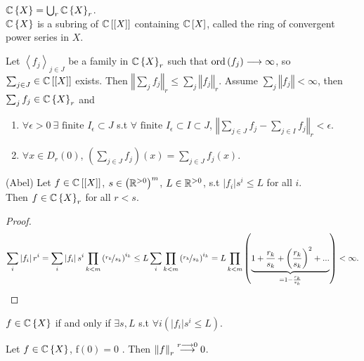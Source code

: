 \begin{defn*}
\label{10.4} $\mathbb{C}\left\{ X\right\} =\bigcup_{r}\mathbb{C}\left\{ X\right\} _{r}$.\\
$\mathbb{C}\left\{ X\right\} $ is a subring of $\mathbb{C}\left[\left[X\right]\right]$
containing $\mathbb{C}\left[X\right]$, called the ring of convergent power
series in $X$.\end{defn*}
\begin{xca*}
\label{10.5} Let $\left\langle f_{j}\right\rangle _{j\in J}$ be a family
in $\mathbb{C}\left\{ X\right\} _{r}$ such that $\mathrm{ord}\left(f_{j}\right)\longrightarrow\infty$,
so $\sum_{j\in J}\in\mathbb{C}\left[\left[X\right]\right]$ exists. Then $\left\Vert \sum_{j}f_{j}\right\Vert _{r}\leq\sum_{j}\left\Vert f_{j}\right\Vert _{r}$.
Assume $\sum_{j}\left\Vert f_{j}\right\Vert <\infty$, then $\sum_{j}f_{j}\in\mathbb{C}\left\{ X\right\} _{r}$
and\end{xca*}
\begin{enumerate}
\item $\forall\epsilon>0\ \exists\textrm{ finite }I_{\epsilon}\subset J$ s.t
$\forall\textrm{ finite }I_{\epsilon}\subset I\subset J$, $\left\Vert \sum_{j\in J}f_{j}-\sum_{j\in I}f_{j}\right\Vert _{r}<\epsilon$.
\item $\forall x\in D_{r}\left(0\right)$, $\left(\sum_{j\in J}f_{j}\right)\left(x\right)=\sum_{j\in J}f_{j}\left(x\right)$.\end{enumerate}
\begin{lem*}
\label{10.6} (Abel) Let $f\in\mathbb{C}\left[\left[X\right]\right]$, $s\in\left(\mathbb{R}^{>0}\right)^{m}$,
$L\in\mathbb{R}^{>0}$, s.t $\left|f_{i}\right|s^{i}\leq L$ for all $i$.\\
Then $f\in\mathbb{C}\left\{ X\right\} _{r}$ for all $r<s$.\end{lem*}
\begin{proof}
\[
\sum_{i}\left|f_{i}\right|r^{i}=\sum_{i}\left|f_{i}\right|s^{i}\prod_{k<m}\left(\nicefrac{r_{k}}{s_{k}}\right)^{i_{k}}\leq L\sum_{i}\prod_{k<m}\left(\nicefrac{r_{k}}{s_{k}}\right)^{i_{k}}=L\prod_{k<m}\left(\underbrace{1+\frac{r_{k}}{s_{k}}+\left(\frac{r_{k}}{s_{k}}\right)^{2}+...}_{=1-\frac{r_{k}}{s_{k}}}\right)<\infty.
\]
 \end{proof}
\begin{cor*}
\label{10.7} $f\in\mathbb{C}\left\{ X\right\} $ if and only if $\exists s,L$ s.t
$\forall i\left(\left|f_{i}\right|s^{i}\leq L\right)$.\end{cor*}
\begin{lem*}
\label{10.8} Let $f\in\mathbb{C}\left\{ X\right\} $, f$\left(0\right)=0$ . Then
$\left\Vert f\right\Vert _{r}\overset{r\longrightarrow0}{\longrightarrow}0$.\end{lem*}
